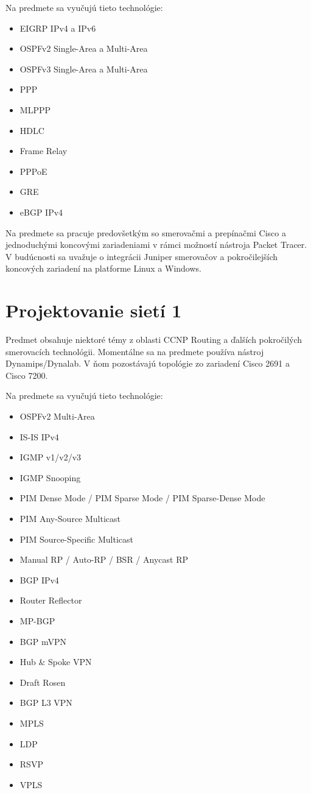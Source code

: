 Na predmete sa vyučujú tieto technológie:

\begin{itemize}
    \item EIGRP IPv4 a IPv6
    \item OSPFv2 Single-Area a Multi-Area
    \item OSPFv3 Single-Area a Multi-Area
    \item PPP
    \item MLPPP
    \item HDLC
    \item Frame Relay	
    \item PPPoE
    \item GRE
    \item eBGP IPv4
\end{itemize}

Na predmete sa pracuje predovšetkým so smerovačmi a prepínačmi Cisco a jednoduchými koncovými zariadeniami v rámci možností nástroja Packet Tracer. V budúcnosti sa uvažuje o integrácii Juniper smerovačov a pokročilejších koncových zariadení na platforme Linux a Windows.




\section{Projektovanie sietí 1}

Predmet obsahuje niektoré témy z oblasti CCNP Routing a ďalších pokročilých smerovacích technológii. Momentálne sa na predmete používa nástroj Dynamips/Dynalab. V ňom pozostávajú topológie zo zariadení Cisco 2691 a Cisco 7200.

Na predmete sa vyučujú tieto technológie:

\begin{itemize}
    \item OSPFv2 Multi-Area
    \item IS-IS IPv4 
    \item IGMP v1/v2/v3
    \item IGMP Snooping
    \item PIM Dense Mode / PIM Sparse Mode / PIM Sparse-Dense Mode
    \item PIM Any-Source Multicast
    \item PIM Source-Specific Multicast
    \item Manual RP / Auto-RP / BSR / Anycast RP
    \item BGP IPv4
    \item Router Reflector
    \item MP-BGP
    \item BGP mVPN
    \item Hub \& Spoke VPN
    \item Draft Rosen
    \item BGP L3 VPN
    \item MPLS
    \item LDP
    \item RSVP
    \item VPLS
\end{itemize}

